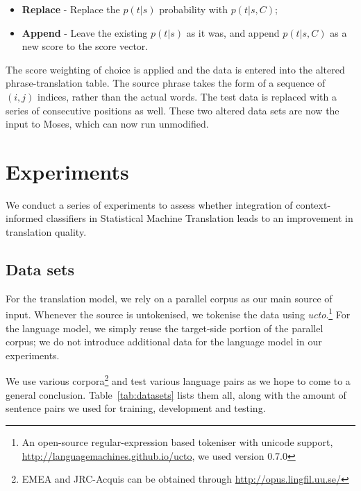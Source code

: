 \begin{itemize}
  \item \textbf{Replace} - Replace the $p(t|s)$ probability with $p(t|s,C)$;
  \item \textbf{Append} - Leave the existing $p(t|s)$ as it was, and append
    $p(t|s,C)$ as a new score to the score vector.
\end{itemize}

The score weighting of choice is applied and the data is entered into the
altered phrase-translation table. The source phrase takes the form of a
sequence of $(i,j)$ indices, rather than the actual words. The test data is
replaced with a series of consecutive positions as well. These two altered data
sets are now the input to Moses, which can now run unmodified. 

\section{Experiments}
\label{sec:experiments}

We conduct a series of experiments to assess whether integration of
context-informed classifiers in Statistical Machine Translation leads to
an improvement in translation quality. 


\subsection{Data sets}

For the translation model, we rely on a parallel corpus as our main source of
input. Whenever the source is untokenised, we tokenise the data using
\emph{ucto}.\footnote{An open-source regular-expression based tokeniser with
unicode support, \url{http://languagemachines.github.io/ucto}, we used version 0.7.0} For the language model, we
simply reuse the target-side portion of the parallel corpus; we do not
introduce additional data for the language model in our experiments.

We use various corpora\footnote{EMEA and JRC-Acquis can be obtained through
\url{http://opus.lingfil.uu.se/}} and test various language pairs as we hope to
come to a general conclusion. Table~\ref{tab:datasets} lists them all, along with the amount of
sentence pairs we used for training, development and testing.

